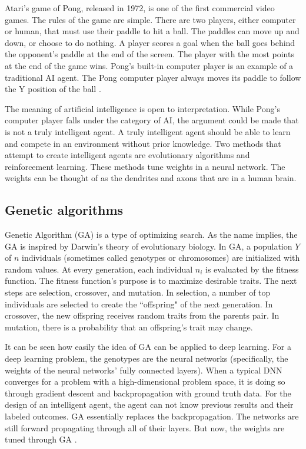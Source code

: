 \documentclass[conference]{IEEEtran}
\begin{document}
Atari's game of Pong, released in 1972, is one of the first commercial video games. The rules of the game are simple. There are two players, either computer or human, that must use their paddle to hit a ball. The paddles can move up and down, or choose to do nothing. A player scores a goal when the ball goes behind the opponent's paddle at the end of the screen. The player with the most points at the end of the game wins. Pong's built-in computer player is an example of a traditional AI agent. The Pong computer player always moves its paddle to follow the Y position of the ball \cite{pong_info}.

The meaning of artificial intelligence is open to interpretation. While Pong's computer player falls under the category of AI, the argument could be made that is not a truly intelligent agent. A truly intelligent agent should be able to learn and compete in an environment without prior knowledge. Two methods that attempt to create intelligent agents are evolutionary algorithms and reinforcement learning. These methods tune weights in a neural network. The weights can be thought of as the dendrites and axons that are in a human brain. 

\subsection{Genetic algorithms}

Genetic Algorithm (GA) is a type of optimizing search. As the name implies, the GA is inspired by Darwin's theory of evolutionary biology. In GA, a population $Y$ of $n$ individuals (sometimes called genotypes or chromosomes) are initialized with random values. At every generation, each individual $n_i$ is evaluated by the fitness function. The fitness function's purpose is to maximize desirable traits. The next steps are selection, crossover, and mutation. In selection, a number of top individuals are selected to create the ``offspring" of the next generation. In crossover, the new offspring receives random traits from the parents pair. In mutation, there is a probability that an offspring's trait may change.

It can be seen how easily the idea of GA can be applied to deep learning. For a deep learning problem, the genotypes are the neural networks (specifically, the weights of the neural networks' fully connected layers). When a typical DNN converges for a problem with a high-dimensional problem space, it is doing so through gradient descent and backpropagation with ground truth data. For the design of an intelligent agent, the agent can not know previous results and their labeled outcomes. GA essentially replaces the backpropagation. The networks are still forward propagating through all of their layers. But now, the weights are tuned through GA \cite{DBLP:journals/corr/abs-1712-06567} \cite{katoch2021review}.
\end{document}
